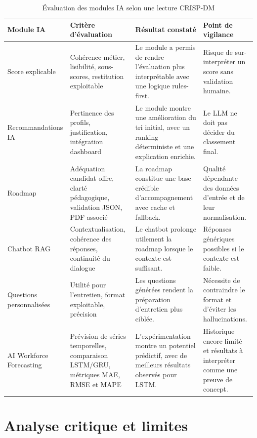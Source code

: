 \begin{table}[H]
\centering
\small
\renewcommand{\arraystretch}{1.3}
\begin{tabular}{|p{3.2cm}|p{3.7cm}|p{4.1cm}|p{3.2cm}|}
\hline
\rowcolor{headerblue}
\textbf{Module IA} & \textbf{Critère d'évaluation} & \textbf{Résultat constaté} & \textbf{Point de vigilance} \\
\hline
Score explicable & Cohérence métier, lisibilité, sous-scores, restitution exploitable & Le module a permis de rendre l'évaluation plus interprétable avec une logique rules-first. & Risque de sur-interpréter un score sans validation humaine. \\
\hline
Recommandations IA & Pertinence des profils, justification, intégration dashboard & Le module montre une amélioration du tri initial, avec un ranking déterministe et une explication enrichie. & Le LLM ne doit pas décider du classement final. \\
\hline
Roadmap & Adéquation candidat-offre, clart\'e pédagogique, validation JSON, PDF associé & La roadmap constitue une base crédible d'accompagnement avec cache et fallback. & Qualité dépendante des données d'entrée et de leur normalisation. \\
\hline
Chatbot RAG & Contextualisation, cohérence des réponses, continuit\'e du dialogue & Le chatbot prolonge utilement la roadmap lorsque le contexte est suffisant. & Réponses génériques possibles si le contexte est faible. \\
\hline
Questions personnalisées & Utilité pour l'entretien, format exploitable, précision & Les questions générées rendent la préparation d'entretien plus ciblée. & Nécessite de contraindre le format et d'éviter les hallucinations. \\
\hline
AI Workforce Forecasting & Prévision de séries temporelles, comparaison LSTM/GRU, métriques MAE, RMSE et MAPE & L'expérimentation montre un potentiel prédictif, avec de meilleurs résultats observés pour LSTM. & Historique encore limité et résultats à interpréter comme une preuve de concept. \\
\hline
\end{tabular}
\normalsize
\caption{Évaluation des modules IA selon une lecture CRISP-DM}
\end{table}

\section{Analyse critique et limites}

